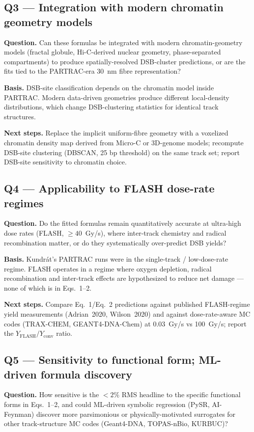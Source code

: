 \subsection*{Q3 --- Integration with modern chromatin geometry models}
\textbf{Question.} Can these formulas be integrated with modern chromatin-geometry models (fractal globule, Hi-C-derived nuclear geometry, phase-separated compartments) to produce spatially-resolved DSB-cluster predictions, or are the fits tied to the PARTRAC-era 30~nm fibre representation?

\textbf{Basis.} DSB-site classification depends on the chromatin model inside PARTRAC. Modern data-driven geometries produce different local-density distributions, which change DSB-clustering statistics for identical track structures.

\textbf{Next steps.} Replace the implicit uniform-fibre geometry with a voxelized chromatin density map derived from Micro-C or 3D-genome models; recompute DSB-site clustering (DBSCAN, 25 bp threshold) on the same track set; report DSB-site sensitivity to chromatin choice.

\subsection*{Q4 --- Applicability to FLASH dose-rate regimes}
\textbf{Question.} Do the fitted formulas remain quantitatively accurate at ultra-high dose rates (FLASH, $\geq 40$~Gy/s), where inter-track chemistry and radical recombination matter, or do they systematically over-predict DSB yields?

\textbf{Basis.} Kundr\'at's PARTRAC runs were in the single-track / low-dose-rate regime. FLASH operates in a regime where oxygen depletion, radical recombination and inter-track effects are hypothesized to reduce net damage --- none of which is in Eqs.~1--2.

\textbf{Next steps.} Compare Eq.~1/Eq.~2 predictions against published FLASH-regime yield measurements (Adrian~2020, Wilson~2020) and against dose-rate-aware MC codes (TRAX-CHEM, GEANT4-DNA-Chem) at 0.03~Gy/s vs 100~Gy/s; report the $Y_{\text{FLASH}}/Y_{\text{conv}}$ ratio.

\subsection*{Q5 --- Sensitivity to functional form; ML-driven formula discovery}
\textbf{Question.} How sensitive is the $<2\%$ RMS headline to the specific functional forms in Eqs.~1--2, and could ML-driven symbolic regression (PySR, AI-Feynman) discover more parsimonious or physically-motivated surrogates for other track-structure MC codes (Geant4-DNA, TOPAS-nBio, KURBUC)?

